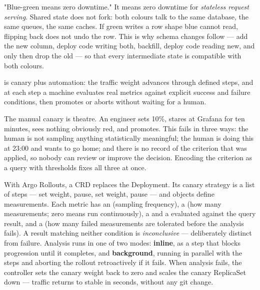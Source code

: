 \begin{misconception}
"Blue-green means zero downtime." It means zero downtime for \emph{stateless request serving}. Shared state does not fork: both colours talk to the same database, the same queues, the same caches. If green writes a row shape blue cannot read, flipping back does not undo the row. This is why schema changes follow  --- add the new column, deploy code writing both, backfill, deploy code reading new, and only then drop the old --- so that every intermediate state is compatible with both colours.
\end{misconception}


  is canary plus automation: the traffic weight advances through defined steps, and at each step a machine evaluates real metrics against explicit success and failure conditions, then promotes or aborts without waiting for a human.

 The manual canary is theatre. An engineer sets 10\%, stares at Grafana for ten minutes, sees nothing obviously red, and promotes. This fails in three ways: the human is not sampling anything statistically meaningful; the human is doing this at 23:00 and wants to go home; and there is no record of the criterion that was applied, so nobody can review or improve the decision. Encoding the criterion as a query with thresholds fixes all three at once.

 With Argo Rollouts, a  CRD replaces the Deployment. Its canary strategy is a list of steps --- set weight, pause, set weight, pause --- and  objects define measurements. Each metric has an  (sampling frequency), a  (how many measurements; zero means run continuously), a  and a  evaluated against the query result, and a  (how many failed measurements are tolerated before the analysis fails). A result matching neither condition is \emph{inconclusive} --- deliberately distinct from failure. Analysis runs in one of two modes: \textbf{inline}, as a step that blocks progression until it completes, and \textbf{background}, running in parallel with the steps and aborting the rollout retroactively if it fails. When analysis fails, the controller sets the canary weight back to zero and scales the canary ReplicaSet down --- traffic returns to stable in seconds, without any git change.

